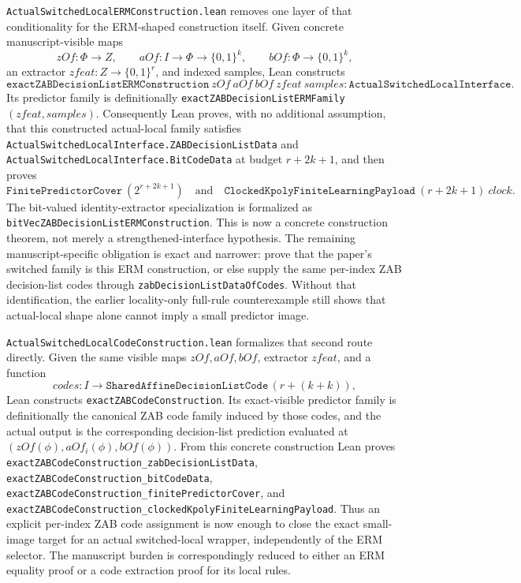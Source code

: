 \documentclass[11pt]{article}
\theoremstyle{remark}
\begin{document}
\texttt{ActualSwitchedLocalERMConstruction.lean} removes one layer of that
conditionality for the ERM-shaped construction itself.  Given concrete
manuscript-visible maps
\[
  zOf : \Phi\to Z,\qquad
  aOf : I\to\Phi\to\{0,1\}^k,\qquad
  bOf : \Phi\to\{0,1\}^k,
\]
an extractor \(zfeat : Z\to\{0,1\}^r\), and indexed samples, Lean constructs
\[
  \texttt{exactZABDecisionListERMConstruction}\ zOf\ aOf\ bOf\ zfeat\
  samples : \texttt{ActualSwitchedLocalInterface}.
\]
Its predictor family is definitionally
\texttt{exactZABDecisionListERMFamily}\((zfeat,samples)\).  Consequently Lean
proves, with no additional assumption, that this constructed actual-local
family satisfies
\texttt{ActualSwitchedLocalInterface.ZABDecisionListData} and
\texttt{ActualSwitchedLocalInterface.BitCodeData} at budget \(r+2k+1\), and
then proves
\[
  \texttt{FinitePredictorCover}\ (2^{r+2k+1})
  \quad\text{and}\quad
  \texttt{ClockedKpolyFiniteLearningPayload}\ (r+2k+1)\ clock .
\]
The bit-valued identity-extractor specialization is formalized as
\texttt{bitVecZABDecisionListERMConstruction}.  This is now a concrete
construction theorem, not merely a strengthened-interface hypothesis.  The
remaining manuscript-specific obligation is exact and narrower: prove that the
paper's switched family is this ERM construction, or else supply the same
per-index ZAB decision-list codes through
\texttt{zabDecisionListDataOfCodes}.  Without that identification, the earlier
locality-only full-rule counterexample still shows that actual-local shape
alone cannot imply a small predictor image.

\texttt{ActualSwitchedLocalCodeConstruction.lean} formalizes that second route
directly.  Given the same visible maps \(zOf,aOf,bOf\), extractor \(zfeat\),
and a function
\[
  codes : I\to
    \texttt{SharedAffineDecisionListCode}\,(r+(k+k)),
\]
Lean constructs
\texttt{exactZABCodeConstruction}.  Its exact-visible predictor family is
definitionally the canonical ZAB code family induced by those codes, and the
actual output is the corresponding decision-list prediction evaluated at
\((zOf(\phi),aOf_i(\phi),bOf(\phi))\).  From this concrete construction Lean
proves
\texttt{exactZABCodeConstruction\_zabDecisionListData},
\texttt{exactZABCodeConstruction\_bitCodeData},
\texttt{exactZABCodeConstruction\_finitePredictorCover}, and
\texttt{exactZABCodeConstruction\_clockedKpolyFiniteLearningPayload}.  Thus an
explicit per-index ZAB code assignment is now enough to close the exact
small-image target for an actual switched-local wrapper, independently of the
ERM selector.  The manuscript burden is correspondingly reduced to either an
ERM equality proof or a code extraction proof for its local rules.
\end{document}
